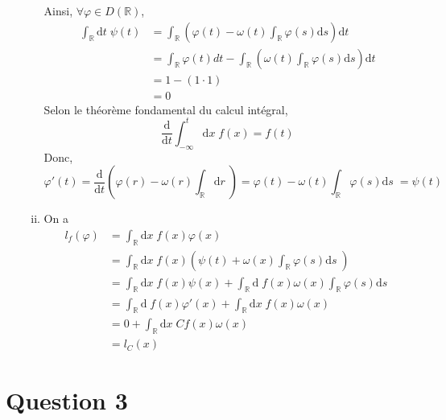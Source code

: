 \documentclass[letterpaper,12pt,oneside,final]{book}
\begin{document}
\begin{enumerate}[a)]
\begin{enumerate}[(i)]
Ainsi, \( \forall \varphi \in D(\mathbb{R}) \),
\begin{equation*}
\begin{split}
	\int_{\mathbb{R} }\text{d}t\;\psi(t) & = \int_{\mathbb{R}}\left(\varphi(t) - \omega(t)\int_{\mathbb{R}} \varphi(s) \text{d}s\right)\text{d}t \\ 
& = \int_{\mathbb{R} } \varphi (t) dt - \int_{\mathbb{R} }\left( \omega(t)\int_{\mathbb{R}}\varphi(s)\text{d}s   \right) \text{d}t\\ 
& = 1- \left( 1\cdot 1 \right) \\ 
& = 0
\end{split}
\end{equation*}
Selon le théorème fondamental du calcul intégral, 
\[ \frac{\text{d}}{\text{d}t} \int_{-\infty }^{t}\text{d}x\;f(x) = f(t)  \]
Donc, 
\[ \varphi '(t) = \frac{\text{d}}{\text{d}t} \left( \varphi(r) - \omega(r)\int_{\mathbb{R} }\text{d}r\; \right)  = \varphi(t) -\omega(t) \int_{\mathbb{R}}\varphi(s)\text{d}s\;   =\psi(t)  \]

\item 
On a
\begin{equation*}
\begin{split}
l_{f}(\varphi) & = \int_{\mathbb{R} }\text{d}x\; f(x) \varphi(x)  \\ 
& = \int_{\mathbb{R} }\text{d}x\; f(x)\left( \psi(t) +\omega(x) \int_{\mathbb{R} }\varphi(s)\text{d}s\; \right) \\ 
& = \int_{\mathbb{R} }\text{d}x\; f(x) \psi(x) + \int_{\mathbb{R} }\text{d}\; f(x)\omega(x)\int_{\mathbb{R} }\varphi(s)\text{d}s\;  \\ 
& = \int_{\mathbb{R} }\text{d}\; f(x) \varphi '(x) + \int_{\mathbb{R} }\text{d}x\;f(x)\omega(x)\\ 
& = 0 + \int_{\mathbb{R} }\text{d}x\; C f(x)\omega(x)\\ 
& = l_{C}(x)
\end{split}
\end{equation*} 
	
\end{enumerate}

\end{enumerate}



\newpage
\section*{Question 3}
\end{document}
